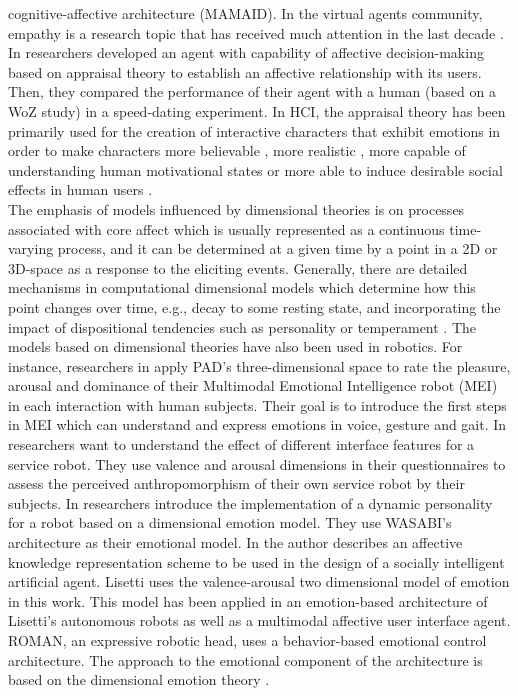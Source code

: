 \documentclass[11pt]{article}
\begin{document}
cognitive-affective architecture (MAMAID). In the virtual agents community,
empathy is a research topic that has received much attention in the last decade
\cite{brave:emotion-hci} \cite{scott:modeling-empathy-agent}
\cite{paiva:agent-care} \cite{prendinger:empathic-companion}
\cite{bickmore:longterm-relationship}. In \cite{pontier:women-robot-men}
researchers developed an agent with capability of affective decision-making
based on appraisal theory to establish an affective relationship with its users.
Then, they compared the performance of their agent with a human (based on a WoZ
study) in a speed-dating experiment. In HCI, the appraisal theory has been
primarily used for the creation of interactive characters that exhibit emotions
in order to make characters more believable \cite{neal:believable-agents}, more
realistic \cite{mao:social-causality} \cite{traum:negotiation-teams-training},
more capable of understanding human motivational states
\cite{conati:evaluating-student-affect} or more able to induce desirable social
effects in human users \cite{paiva:learning-feeling}.\\

The emphasis of models influenced by dimensional theories is on processes
associated with core affect which is usually represented as a continuous
time-varying process, and it can be determined at a given time by a point in a
2D or 3D-space as a response to the eliciting events. Generally, there are
detailed mechanisms in computational dimensional models which determine how this
point changes over time, e.g., decay to some resting state, and incorporating
the impact of dispositional tendencies such as personality or temperament
\cite{gebhard:alma} \cite{marsella:computational-models}. The models based on
dimensional theories have also been used in robotics. For instance, researchers
in \cite{lim:mei-motherese-ei} apply PAD's three-dimensional space to rate the
pleasure, arousal and dominance of their Multimodal Emotional Intelligence robot
(MEI) in each interaction with human subjects. Their goal is to introduce the
first steps in MEI which can understand and express emotions in voice, gesture
and gait. In \cite{zhang:service-robot-dimensional} researchers want to
understand the effect of different interface features for a service robot. They
use valence and arousal dimensions in their questionnaires to assess the
perceived anthropomorphism of their own service robot by their subjects. In
\cite{klug:emotion-based-hri} researchers introduce the implementation of a
dynamic personality for a robot based on a dimensional emotion model. They use
WASABI's architecture \cite{becker:wasabi,becker:wasabi-description} as their
emotional model. In \cite{lisetti:affect-socially-intelligent} the author
describes an affective knowledge representation scheme to be used in the design
of a socially intelligent artificial agent. Lisetti uses the valence-arousal two
dimensional model of emotion in this work. This model has been applied in an
emotion-based architecture of Lisetti's autonomous robots as well as a
multimodal affective user interface agent. ROMAN, an expressive robotic head,
uses a behavior-based emotional control architecture. The approach to the
emotional component of the architecture is based on the dimensional emotion
theory \cite{hirth:roman}.
\end{document}
